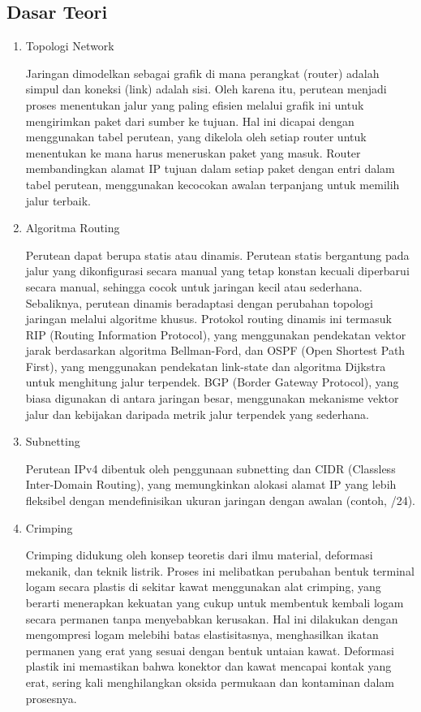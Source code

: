 \subsection{Dasar Teori}
\begin{enumerate}
	\item Topologi Network

	Jaringan dimodelkan sebagai grafik di mana perangkat (router) adalah 
	simpul dan koneksi (link) adalah sisi. Oleh karena itu, perutean menjadi 
	proses menentukan jalur yang paling efisien melalui grafik ini untuk 
	mengirimkan paket dari sumber ke tujuan. Hal ini dicapai dengan 
	menggunakan tabel perutean, yang dikelola oleh setiap router untuk 
	menentukan ke mana harus meneruskan paket yang masuk. Router 
	membandingkan alamat IP tujuan dalam setiap paket dengan entri dalam 
	tabel perutean, menggunakan kecocokan awalan terpanjang untuk memilih 
	jalur terbaik.

	\item Algoritma Routing

	Perutean dapat berupa statis atau dinamis. Perutean statis bergantung 
	pada jalur yang dikonfigurasi secara manual yang tetap konstan kecuali 
	diperbarui secara manual, sehingga cocok untuk jaringan kecil atau 
	sederhana. Sebaliknya, perutean dinamis beradaptasi dengan perubahan 
	topologi jaringan melalui algoritme khusus. Protokol routing dinamis 
	ini termasuk RIP (Routing Information Protocol), yang menggunakan 
	pendekatan vektor jarak berdasarkan algoritma Bellman-Ford, dan OSPF 
	(Open Shortest Path First), yang menggunakan pendekatan link-state dan 
	algoritma Dijkstra untuk menghitung jalur terpendek. BGP (Border Gateway 
	Protocol), yang biasa digunakan di antara jaringan besar, menggunakan 
	mekanisme vektor jalur dan kebijakan daripada metrik jalur terpendek 
	yang sederhana.

	\item Subnetting
	
	Perutean IPv4 dibentuk oleh penggunaan subnetting dan CIDR (Classless 
	Inter-Domain Routing), yang memungkinkan alokasi alamat IP yang lebih 
	fleksibel dengan mendefinisikan ukuran jaringan dengan awalan (contoh, 
	/24).

	\item Crimping
	
	Crimping didukung oleh konsep teoretis dari ilmu material, deformasi 
	mekanik, dan teknik listrik. Proses ini melibatkan perubahan bentuk 
	terminal logam secara plastis di sekitar kawat menggunakan alat crimping, 
	yang berarti menerapkan kekuatan yang cukup untuk membentuk kembali 
	logam secara permanen tanpa menyebabkan kerusakan. Hal ini dilakukan 
	dengan mengompresi logam melebihi batas elastisitasnya, menghasilkan 
	ikatan permanen yang erat yang sesuai dengan bentuk untaian kawat. 
	Deformasi plastik ini memastikan bahwa konektor dan kawat mencapai 
	kontak yang erat, sering kali menghilangkan oksida permukaan dan 
	kontaminan dalam prosesnya.
\end{enumerate}
